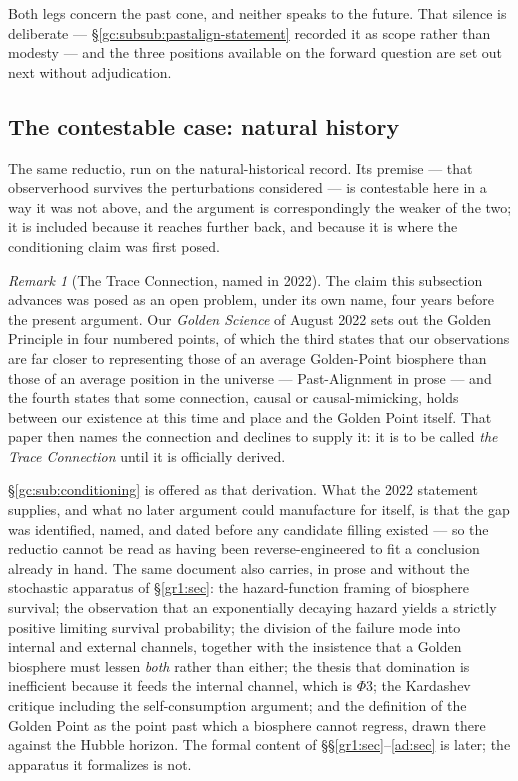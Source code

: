 \documentclass[11pt]{article}
\numberwithin{equation}{section}
\theoremstyle{plain}
\theoremstyle{definition}
\theoremstyle{remark}
\newtheorem{remark}[theorem]{Remark}
\begin{document}
Both legs concern the past cone, and neither speaks to the future. That
silence is deliberate --- \S\ref{gc:subsub:pastalign-statement} recorded
it as scope rather than modesty --- and the three positions available on
the forward question are set out next without adjudication.

\subsection{The contestable case: natural history}\label{gc:sub:naturalhistory}

The same reductio, run on the natural-historical record. Its premise
--- that observerhood survives the perturbations considered --- is
contestable here in a way it was not above, and the argument is
correspondingly the weaker of the two; it is included because it reaches
further back, and because it is where the conditioning claim was first
posed.

\begin{remark}[The Trace Connection, named in 2022]
\label{gc:rem:trace}
The claim this subsection advances was posed as an open problem, under
its own name, four years before the present argument. Our
\emph{Golden Science} of August 2022 \cite{GoldenScience22} sets out the
Golden Principle in four numbered points, of which the third states that
our observations are far closer to representing those of an average
Golden-Point biosphere than those of an average position in the universe
--- Past-Alignment in prose --- and the fourth states that some
connection, causal or causal-mimicking, holds between our existence at
this time and place and the Golden Point itself. That paper then names
the connection and declines to supply it: it is to be called \emph{the
Trace Connection} until it is officially derived.

\S\ref{gc:sub:conditioning} is offered as that derivation. What the 2022
statement supplies, and what no later argument could manufacture for
itself, is that the gap was identified, named, and dated before any
candidate filling existed --- so the reductio cannot be read as having
been reverse-engineered to fit a conclusion already in hand. The same
document also carries, in prose and without the stochastic apparatus of
\S\ref{gr1:sec}: the hazard-function framing of biosphere survival; the
observation that an exponentially decaying hazard yields a strictly
positive limiting survival probability; the division of the failure mode
into internal and external channels, together with the insistence that a
Golden biosphere must lessen \emph{both} rather than either; the thesis
that domination is inefficient because it feeds the internal channel,
which is $\Phi3$; the Kardashev critique including the
self-consumption argument; and the definition of the Golden Point as the
point past which a biosphere cannot regress, drawn there against the
Hubble horizon. The formal content of
\S\S\ref{gr1:sec}--\ref{ad:sec} is later; the apparatus it formalizes is
not.
\end{remark}
\end{document}
